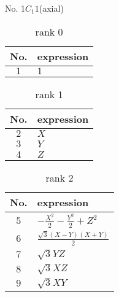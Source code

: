 \documentclass[fleqn,8pt,landscape]{jsarticle}
\begin{document}
\setcounter{MaxMatrixCols}{16}

\begin{center}
\LARGE
No. 1\quad$C_{1}$\quad$1$\quad[ triclinic ] (axial)
\end{center}
\begin{table}[ht!]
\begin{center}
\caption{rank 0}
\renewcommand{\arraystretch}{1.3}
\begin{tabular}{cl} \hline \hline
No. & expression \\ \hline
$ 1 $ & $ 1 $ \\
 \hline \hline
\end{tabular}
\end{center}
\end{table}
\begin{table}[ht!]
\begin{center}
\caption{rank 1}
\renewcommand{\arraystretch}{1.3}
\begin{tabular}{cl} \hline \hline
No. & expression \\ \hline
$ 2 $ & $ X $ \\
$ 3 $ & $ Y $ \\
$ 4 $ & $ Z $ \\
 \hline \hline
\end{tabular}
\end{center}
\end{table}
\begin{table}[ht!]
\begin{center}
\caption{rank 2}
\renewcommand{\arraystretch}{1.3}
\begin{tabular}{cl} \hline \hline
No. & expression \\ \hline
$ 5 $ & $ - \frac{X^{2}}{2} - \frac{Y^{2}}{2} + Z^{2} $ \\
$ 6 $ & $ \frac{\sqrt{3} \left(X - Y\right) \left(X + Y\right)}{2} $ \\
$ 7 $ & $ \sqrt{3} Y Z $ \\
$ 8 $ & $ \sqrt{3} X Z $ \\
$ 9 $ & $ \sqrt{3} X Y $ \\
 \hline \hline
\end{tabular}
\end{center}
\end{table}
\end{document}
